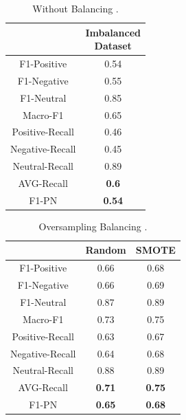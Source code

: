 \documentclass[conference]{IEEEtran}
\begin{document}
\begin{table}[!ht]
	\large        %
	\caption{Without Balancing .}\label{label}
	\centering    %
	\begin{tabular}{|c|c|}
		\hline
		&\thead{Imbalanced \\ Dataset}\\     %
		\hline
		F1-Positive&0.54\\
		\hline
		F1-Negative&0.55\\
		\hline
		F1-Neutral&0.85\\
		\hline
		Macro-F1&0.65\\
		
		\hline
		Positive-Recall&0.46\\
		\hline
		Negative-Recall&0.45\\
		\hline
		Neutral-Recall&0.89\\
		\hline
		AVG-Recall&\textbf{0.6}\\
		\hline
		F1-PN&\textbf{0.54}\\
		\hline
	\end{tabular}
\end{table}


\begin{table}[!ht]
	\large        %
	\caption{Oversampling Balancing .}\label{label}
	\centering    %
	\begin{tabular}{|c|c|c|}
		\hline
		&Random&SMOTE\\     %
		\hline
		F1-Positive&0.66 &0.68\\
		\hline
		F1-Negative&0.66&0.69\\
		\hline
		F1-Neutral&0.87&0.89\\
		\hline
		Macro-F1&0.73&0.75\\
		\hline
		Positive-Recall&0.63&0.67\\
		\hline
		Negative-Recall&0.64&0.68\\
		\hline
		Neutral-Recall&0.88&0.89\\
		\hline
		AVG-Recall&\textbf{0.71}&\textbf{0.75}\\
		\hline
		F1-PN&\textbf{0.65}&\textbf{0.68}\\
	\hline
	\end{tabular}
\end{table}
\end{document}
